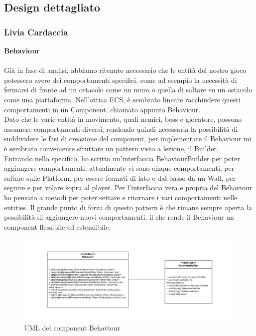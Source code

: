 \documentclass{article}
\begin{document}
\newpage
\subsection{Design dettagliato}
\subsubsection{Livia Cardaccia}
\textbf{Behaviour}\\
\\
Già in fase di analisi, abbiamo ritenuto necessario che le entità del nostro gioco potessero avere dei comportamenti specifici, come ad esempio la necessità di fermarsi di fronte ad un ostacolo come un muro o quella di saltare su un ostacolo come una piattaforma.
Nell'ottica ECS, è sembrato lineare racchiudere questi comportamenti in un Component, chiamato appunto Behaviour.\\ Dato che le varie entità in movimento, quali nemici, boss e giocatore, possono assumere comportamenti diversi, rendendo quindi necessaria la possibilità di suddividere le fasi di creazione del component, per implementare il Behaviour mi è sembrato conveniente sfruttare un pattern visto a lezione, il Builder.\\ Entrando nello specifico, ho scritto un'interfaccia BehaviourBuilder per poter aggiungere comportamenti: attualmente vi sono cinque comportamenti, per saltare sulle Platform, per essere fermati di lato e dal basso da un Wall, per seguire e per volare sopra al player. Per l'interfaccia vera e propria del Behaviour ho pensato a metodi per poter settare e ritornare i vari comportamenti nelle entities. Il grande punto di forza di questo pattern è che rimane sempre aperta la possibilità di aggiungere nuovi comportamenti, il che rende il Behaviour un component flessibile ed estendibile.

\begin{figure}[ht]
\includegraphics[width=1\textwidth]{umlBehaviour.png}
\caption{UML del component Behaviour}
\label{fig:schgen}
\end{figure}
\end{document}
